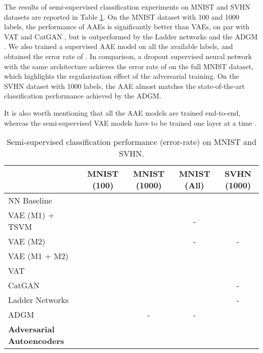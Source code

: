 \documentclass{article}
\begin{document}
The results of semi-supervised classification experiments on MNIST and SVHN datasets are reported in Table \ref{table:semi}. On the MNIST dataset with 100 and 1000 labels, the performance of AAEs is significantly better than VAEs, on par with VAT \citep{vat} and CatGAN \citep{catgan}, but is outperformed by the Ladder networks \citep{ladder} and the ADGM \citep{adgm}. We also trained a supervised AAE model on all the available labels, and obtained the error rate of . In comparison, a dropout supervised neural network with the same architecture achieves the error rate of  on the full MNIST dataset, which highlights the regularization effect of the adversarial training. On the SVHN dataset with 1000 labels, the AAE almost matches the state-of-the-art classification performance achieved by the ADGM. 

It is also worth mentioning that all the AAE models are trained end-to-end, whereas the semi-supervised VAE models have to be trained one layer at a time \citep{semi-vae}. 



\begin{center}
\begin{table}[t]
\small
\centering \begin{tabular}{ l  || c | c | c || c}
  \hline
  & MNIST (100) & MNIST (1000) & MNIST (All) & SVHN (1000)\\
  \hline

  NN Baseline &  &  &  & \\
  \hline
VAE (M1) + TSVM    &  &    & -                  &       \\
  VAE (M2)           &  &    & -                  & -                        \\
  VAE (M1 + M2)      &   &    &              &       \\
  VAT                     &               &                &  &                   \\
  CatGAN               &    &    &              & -                        \\  
  Ladder Networks      &   &    &  & -                        \\
  ADGM                   &   & -                    & -                  &       \\
\hline 
  \textbf{Adversarial Autoencoders} &   &  &  &  \\
  \hline
\end{tabular}
\caption{\label{table:semi}Semi-supervised classification performance (error-rate) on MNIST and SVHN.}
\end{table}
\end{center}
\end{document}
